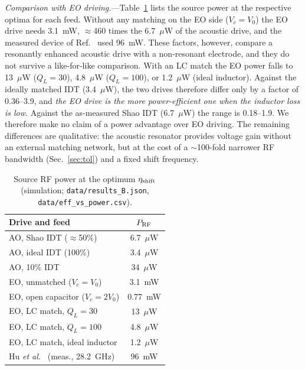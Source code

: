 \documentclass[aps,prapplied,reprint,superscriptaddress,amsmath,amssymb,floatfix]{revtex4-2}
\newcommand{\etash}{\eta_{\rm shift}}
\newcommand{\Pg}{P_{\rm RF}}
\begin{document}
\emph{Comparison with EO driving.}---Table~\ref{tab:power} lists the source power at the respective optima for each feed. Without any matching on the EO side ($V_c=V_0$) the EO drive needs 3.1~mW, $\approx$460 times the 6.7~$\mu$W of the acoustic drive, and the measured device of Ref.~\cite{Hu2021} used 96~mW. These factors, however, compare a resonantly enhanced acoustic drive with a non-resonant electrode, and they do not survive a like-for-like comparison. With an LC match the EO power falls to 13~$\mu$W ($Q_L=30$), 4.8~$\mu$W ($Q_L=100$), or 1.2~$\mu$W (ideal inductor). Against the ideally matched IDT (3.4~$\mu$W), the two drives therefore differ only by a factor of 0.36--3.9, and \emph{the EO drive is the more power-efficient one when the inductor loss is low}. Against the as-measured Shao IDT (6.7~$\mu$W) the range is 0.18--1.9. We therefore make no claim of a power advantage over EO driving. The remaining differences are qualitative: the acoustic resonator provides voltage gain without an external matching network, but at the cost of a $\sim$100-fold narrower RF bandwidth (Sec.~\ref{sec:tol}) and a fixed shift frequency.

\begin{table}[t]
\caption{Source RF power at the optimum $\etash$ (simulation; \texttt{data/results\_B.json}, \texttt{data/eff\_vs\_power.csv}).}
\label{tab:power}
\begin{ruledtabular}
\begin{tabular}{lc}
Drive and feed & $\Pg$\\
\hline
AO, Shao IDT ($\approx$50\%) & 6.7~$\mu$W\\
AO, ideal IDT (100\%) & 3.4~$\mu$W\\
AO, 10\% IDT & 34~$\mu$W\\
EO, unmatched ($V_c=V_0$) & 3.1~mW\\
EO, open capacitor ($V_c=2V_0$) & 0.77~mW\\
EO, LC match, $Q_L=30$ & 13~$\mu$W\\
EO, LC match, $Q_L=100$ & 4.8~$\mu$W\\
EO, LC match, ideal inductor & 1.2~$\mu$W\\
\hline
Hu \emph{et al.}~\cite{Hu2021} (meas., 28.2~GHz) & 96~mW\\
\end{tabular}
\end{ruledtabular}
\end{table}
\end{document}
